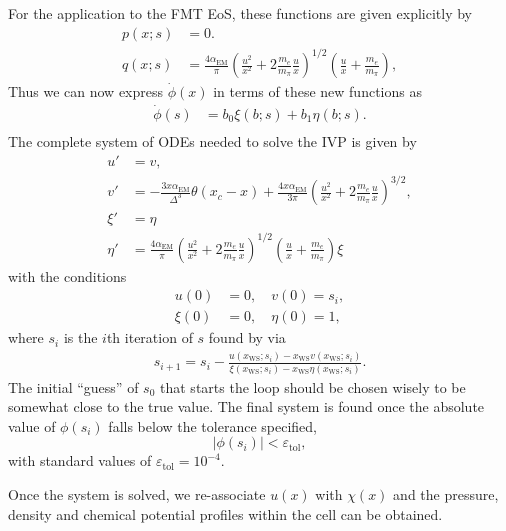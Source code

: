 For the application to the FMT EoS, these functions are given explicitly by
\begin{align}
    p(x;s) & = 0.\\
    q(x;s) & = \frac{4\alpha_\mathrm{EM} }{\pi}\left( \frac{u^2}{x^2} + 2\frac{m_e}{m_\pi}\frac{u}{x} \right)^{1/2}\left( \frac{u}{x} + \frac{m_e}{m_\pi} \right),
\end{align}
Thus we can now express $\dot \phi (x)$ in terms of these new functions as
\begin{align}
    \dot{\phi}(s) &= b_0 \xi(b;s) + b_1\eta(b;s).\\
\end{align}
The complete system of ODEs needed to solve the IVP is given by  
\begin{align}
    u' & = v,\\
    v' & = -\frac{3 x \alpha_\mathrm{EM}}{\Delta^3}\theta(x_c -x) + \frac{4 x\alpha_\mathrm{EM}}{3\pi}\left( \frac{u^2}{x^2} + 2\frac{m_e}{m_\pi}\frac{u}{x}\right)^{3/2},\\
    \xi' & = \eta\\
    \eta' & = \frac{4\alpha_\mathrm{EM} }{\pi}\left( \frac{u^2}{x^2} + 2\frac{m_e}{m_\pi}\frac{u}{x} \right)^{1/2}\left( \frac{u}{x} + \frac{m_e}{m_\pi} \right) \xi
\end{align}
with the conditions 
\begin{align}
    u(0) &=0,\quad v(0) =s_i,\\
    \xi(0) &=0,\quad \eta(0) =1,
\end{align}
where $s_i$ is the $i$th iteration of $s$ found by via
\begin{align}
    s_{i+1} = s_i - \frac{u(x_\mathrm{WS};s_i) - x_\mathrm{WS} v(x_\mathrm{WS};s_i)}{\xi(x_\mathrm{WS};s_i) - x_\mathrm{WS} \eta(x_\mathrm{WS};s_i)}.
\end{align}
The initial ``guess'' of $s_0$ that starts the loop should be chosen wisely to be somewhat close to the true value. The final system is found once the absolute value of $\phi(s_i)$ falls below the tolerance specified, 
\begin{equation}
    |\phi(s_i)|<\varepsilon_\mathrm{tol},
\end{equation}
with standard values of $\varepsilon_\mathrm{tol} = 10^{-4}$.

Once the system is solved, we re-associate $u(x)$ with $\chi(x)$ and the pressure, density and chemical potential profiles within the cell can be obtained.

